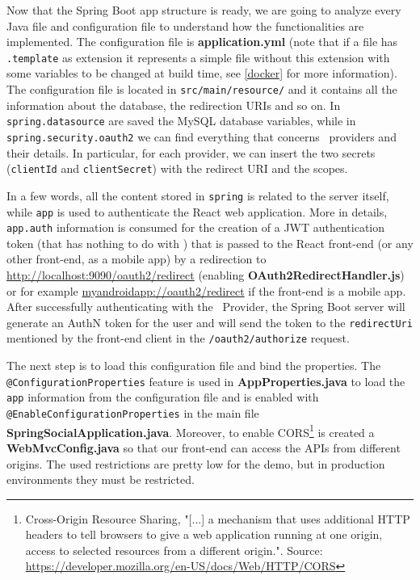 \noindent Now that the Spring Boot app structure is ready, we are going to analyze every Java file and configuration file to understand how the functionalities are implemented. The configuration file is \textbf{application.yml} (note that if a file has \texttt{.template} as extension it represents a simple file without this extension with some variables to be changed at build time, see \ref{docker} for more information). The configuration file is located in \texttt{src/main/resource/} and it contains all the information about the database, the redirection URIs and so on. In \texttt{spring.datasource} are saved the MySQL database variables, while in \texttt{spring.security.oauth2} we can find everything that concerns \oauth\ providers and their details. In particular, for each provider, we can insert the two secrets (\texttt{clientId} and \texttt{clientSecret}) with the redirect URI and the scopes.

In a few words, all the content stored in \texttt{spring} is related to the server itself, while \texttt{app} is used to authenticate the React web application. More in details, \texttt{app.auth} information is consumed for the creation of a JWT authentication token (that has nothing to do with \oauth) that is passed to the React front-end (or any other front-end, as a mobile app) by a redirection to \\ \url{http://localhost:9090/oauth2/redirect} (enabling \textbf{OAuth2RedirectHandler.js}) or for example \url{myandroidapp://oauth2/redirect} if the front-end is a mobile app.
After successfully authenticating with the \oauth\ Provider, the Spring Boot server will generate an AuthN token for the user and will send the token to the \texttt{redirectUri} mentioned by the front-end client in the \texttt{/oauth2/authorize} request. 

The next step is to load this configuration file and bind the properties. The \\ \texttt{@ConfigurationProperties} feature is used in \textbf{AppProperties.java} to load the \texttt{app} information from the configuration file and is enabled with  \texttt{@EnableConfigurationProperties} in the main file \textbf{SpringSocialApplication.java}. Moreover, to enable CORS\footnote{Cross-Origin Resource Sharing, "[...] a mechanism that uses additional HTTP headers to tell browsers to give a web application running at one origin, access to selected resources from a different origin.". Source: \url{https://developer.mozilla.org/en-US/docs/Web/HTTP/CORS}} is created a \textbf{WebMvcConfig.java}  so that our front-end can access the APIs from different origins. The used restrictions are pretty low for the demo, but in production environments they must be restricted.


